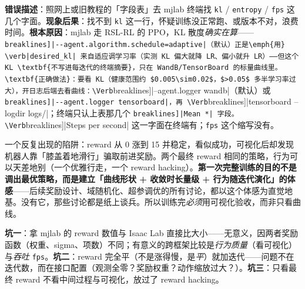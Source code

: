 \begin{pitfall}
\textbf{错误描述}：照网上或旧教程的「字段表」去 mjlab 终端找 \verb|kl| / \verb|entropy| / \verb|fps| 这几个字面。\textbf{现象后果}：找不到 \verb|kl| 这一行，怀疑训练没正常跑、或版本不对，浪费时间。\textbf{根本原因}：mjlab 走 RSL-RL 的 PPO，KL 散度\emph{确实在算}——\Verb[breaklines]|--agent.algorithm.schedule=adaptive|（默认）正是\emph{用} \verb|desired_kl| 来自适应调学习率（实测 KL 偏大就降 LR、偏小就升 LR）——但这个 KL \textbf{不写进每迭代的终端摘要}，只在 WandB/TensorBoard 的标量曲线里。\textbf{正确做法}：要看 KL（健康范围约 $0.005\sim0.02$，$>0.05$ 多半学习率过大），开日志后端去看曲线：\Verb[breaklines]|--agent.logger wandb|（默认）或 \Verb[breaklines]|--agent.logger tensorboard|，再 \Verb[breaklines]|tensorboard --logdir logs/|；终端只认上表那几个 \Verb[breaklines]|Mean *| 字段。\Verb[breaklines]|Steps per second| 这一字面在终端有；\verb|fps| 这个缩写没有。
\end{pitfall}


\begin{insight}\label{ins:rlmc-reward-not-behavior}
一个反复出现的陷阱：reward 从 0 涨到 15 并稳定，看似成功，可视化后却发现机器人靠「膝盖着地滑行」骗取前进奖励。两个最终 reward 相同的策略，行为可以天差地别（一个优雅行走，一个 reward hacking）。\textbf{第一次完整训练的目的不是调出最优策略，而是建立「曲线形状 + 收敛时长量级 + 行为随迭代演化」的体感}——后续奖励设计、域随机化、超参调优的所有讨论，都以这个体感为直觉地基。没有它，那些讨论都是纸上谈兵。所以训练完\emph{必须}用可视化验收，而非只看曲线。
\end{insight}

\begin{pitfall}
\textbf{坑一}：拿 mjlab 的 reward 数值与 Isaac Lab 直接比大小——无意义，因两者奖励函数（权重、sigma、项数）不同；有意义的跨框架比较是\emph{行为质量}（看可视化）与\emph{吞吐} \verb|fps|。\textbf{坑二}：reward 完全平（不是涨得慢，是\emph{平}）就加迭代——问题不在迭代数，而在接口配置（观测全零？奖励权重？动作缩放过大？）。\textbf{坑三}：只看最终 reward 不看中间过程与可视化，放过了 reward hacking。
\end{pitfall}

